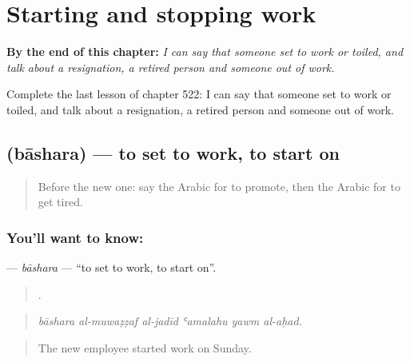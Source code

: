 
\chapter{Starting and stopping work}
\label{ch:ar-starting-and-stopping-work}

\begin{chapteropening}
\textbf{By the end of this chapter:} \emph{I can say that someone set to work or toiled, and talk about a resignation, a retired person and someone out of work.}

Complete the last lesson of chapter 522: I can say that someone set to work or toiled, and talk about a resignation, a retired person and someone out of work.
\end{chapteropening}

\section[\texorpdfstring{\ar{باشر} (bāshara)}{باشر (bāshara)}]{ (bāshara) — to set to work, to start on}

\label{lesson:AR-C522-bashara}



\begin{quote}
Before the new one: say the Arabic for to promote, then the Arabic for to get tired.
\end{quote}

\subsection*{You'll want to know: }
\textbf{} — \emph{bāshara} — \textquotedblleft{}to set to work, to start on\textquotedblright{}.

\begin{quote}
     .
\end{quote}

\begin{quote}
\emph{bāshara al-muwaẓẓaf al-jadīd ʿamalahu yawm al-aḥad.}
\end{quote}

\begin{quote}
The new employee started work on Sunday.
\end{quote}

